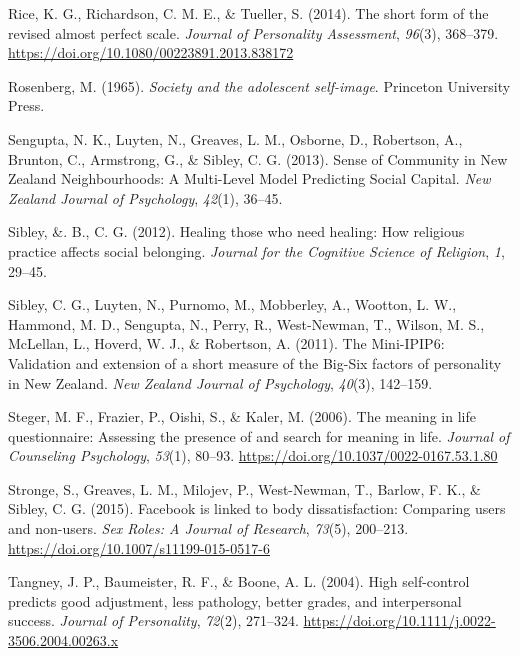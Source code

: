 \documentclass[
  letterpaper,
  DIV=11,
  numbers=noendperiod]{scrartcl}
\newlength{\cslhangindent}
\newlength{\cslentryspacingunit} %
\newenvironment{CSLReferences}[2] %
 {%
  \setlength{\parindent}{0pt}
  \ifodd #1
  \let\oldpar\par
  \def\par{\hangindent=\cslhangindent\oldpar}
  \fi
  \setlength{\parskip}{#2\cslentryspacingunit}
 }%
 {}
\begin{document}
\begin{CSLReferences}{1}{0}
\leavevmode{}%
Rice, K. G., Richardson, C. M. E., \& Tueller, S. (2014). The short form
of the revised almost perfect scale. \emph{Journal of Personality
Assessment}, \emph{96}(3), 368--379.
\url{https://doi.org/10.1080/00223891.2013.838172}

\leavevmode{}%
Rosenberg, M. (1965). \emph{Society and the adolescent self-image}.
Princeton University Press.

\leavevmode{}%
Sengupta, N. K., Luyten, N., Greaves, L. M., Osborne, D., Robertson, A.,
Brunton, C., Armstrong, G., \& Sibley, C. G. (2013). Sense of Community
in New Zealand Neighbourhoods: A Multi-Level Model Predicting Social
Capital. \emph{New Zealand Journal of Psychology}, \emph{42}(1), 36--45.

\leavevmode{}%
Sibley, \&. B., C. G. (2012). Healing those who need healing: How
religious practice affects social belonging. \emph{Journal for the
Cognitive Science of Religion}, \emph{1}, 29--45.

\leavevmode{}%
Sibley, C. G., Luyten, N., Purnomo, M., Mobberley, A., Wootton, L. W.,
Hammond, M. D., Sengupta, N., Perry, R., West-Newman, T., Wilson, M. S.,
McLellan, L., Hoverd, W. J., \& Robertson, A. (2011). The Mini-IPIP6:
Validation and extension of a short measure of the Big-Six factors of
personality in New Zealand. \emph{New Zealand Journal of Psychology},
\emph{40}(3), 142--159.

\leavevmode{}%
Steger, M. F., Frazier, P., Oishi, S., \& Kaler, M. (2006). The meaning
in life questionnaire: Assessing the presence of and search for meaning
in life. \emph{Journal of Counseling Psychology}, \emph{53}(1), 80--93.
\url{https://doi.org/10.1037/0022-0167.53.1.80}

\leavevmode{}%
Stronge, S., Greaves, L. M., Milojev, P., West-Newman, T., Barlow, F.
K., \& Sibley, C. G. (2015). Facebook is linked to body dissatisfaction:
Comparing users and non-users. \emph{Sex Roles: A Journal of Research},
\emph{73}(5), 200--213. \url{https://doi.org/10.1007/s11199-015-0517-6}

\leavevmode{}%
Tangney, J. P., Baumeister, R. F., \& Boone, A. L. (2004). High
self-control predicts good adjustment, less pathology, better grades,
and interpersonal success. \emph{Journal of Personality}, \emph{72}(2),
271--324. \url{https://doi.org/10.1111/j.0022-3506.2004.00263.x}


\end{CSLReferences}
\end{document}
